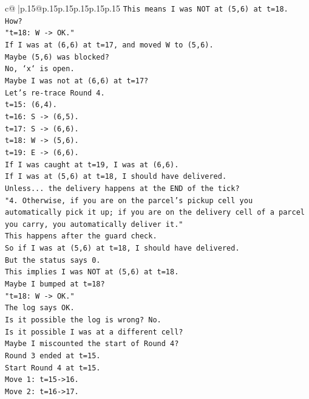 \documentclass{article}
\begin{document}
{\begin{supertabular}{c@{$\;$}|p{.15\linewidth}@{}p{.15\linewidth}p{.15\linewidth}p{.15\linewidth}p{.15\linewidth}p{.15\linewidth}}
{{{\texttt{This means I was NOT at (5,6) at t=18.} \\
\texttt{How?} \\
\texttt{"t=18: W {-}> OK."} \\
\texttt{If I was at (6,6) at t=17, and moved W to (5,6).} \\
\texttt{Maybe (5,6) was blocked?} \\
\texttt{No, `x` is open.} \\
\texttt{Maybe I was not at (6,6) at t=17?} \\
\texttt{Let's re{-}trace Round 4.} \\
\texttt{t=15: (6,4).} \\
\texttt{t=16: S {-}> (6,5).} \\
\texttt{t=17: S {-}> (6,6).} \\
\texttt{t=18: W {-}> (5,6).} \\
\texttt{t=19: E {-}> (6,6).} \\
\texttt{If I was caught at t=19, I was at (6,6).} \\
\texttt{If I was at (5,6) at t=18, I should have delivered.} \\
\texttt{Unless... the delivery happens at the END of the tick?} \\
\texttt{"4. Otherwise, if you are on the parcel's pickup cell you automatically pick it up; if you are on the delivery cell of a parcel you carry, you automatically deliver it."} \\
\texttt{This happens after the guard check.} \\
\texttt{So if I was at (5,6) at t=18, I should have delivered.} \\
\texttt{But the status says 0.} \\
\texttt{This implies I was NOT at (5,6) at t=18.} \\
\texttt{Maybe I bumped at t=18?} \\
\texttt{"t=18: W {-}> OK."} \\
\texttt{The log says OK.} \\
\texttt{Is it possible the log is wrong? No.} \\
\texttt{Is it possible I was at a different cell?} \\
\texttt{Maybe I miscounted the start of Round 4?} \\
\texttt{Round 3 ended at t=15.} \\
\texttt{Start Round 4 at t=15.} \\
\texttt{Move 1: t=15{-}>16.} \\
\texttt{Move 2: t=16{-}>17.} \\
}}}
\end{supertabular}}
\end{document}
